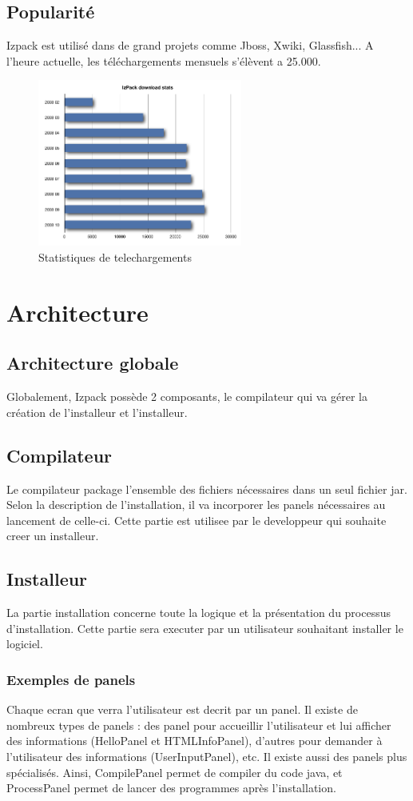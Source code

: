 \subsection{Popularité}
Izpack est utilisé dans de grand projets comme Jboss, Xwiki, Glassfish... A l'heure actuelle, les téléchargements mensuels s'élèvent a 25.000.
\begin{figure}[H]
	\centering
	\includegraphics[width=0.6\textwidth]{../image/telechargements.png}
	\caption{Statistiques de telechargements}
\end{figure}
\section{Architecture}
\subsection{Architecture globale}
Globalement, Izpack possède 2 composants, le compilateur qui va gérer la création de l'installeur et l'installeur.
\subsection{Compilateur}
Le compilateur package l'ensemble des fichiers nécessaires dans un seul fichier jar. Selon la description de l'installation, il va incorporer les panels nécessaires au lancement de celle-ci. Cette partie est utilisee par le developpeur qui souhaite creer un installeur.
\subsection{Installeur}
La partie installation concerne toute la logique et la présentation du processus d'installation. Cette partie sera executer par un utilisateur souhaitant installer le logiciel.
\subsubsection{Exemples de panels}
Chaque ecran que verra l'utilisateur est decrit par un panel.
Il existe de nombreux types de panels : des panel pour accueillir l'utilisateur et lui afficher des informations (HelloPanel et HTMLInfoPanel), d'autres pour demander à l'utilisateur des informations (UserInputPanel), etc.
Il existe aussi des panels plus spécialisés. Ainsi, CompilePanel permet de compiler du code java, et ProcessPanel permet de lancer des programmes après l'installation.

